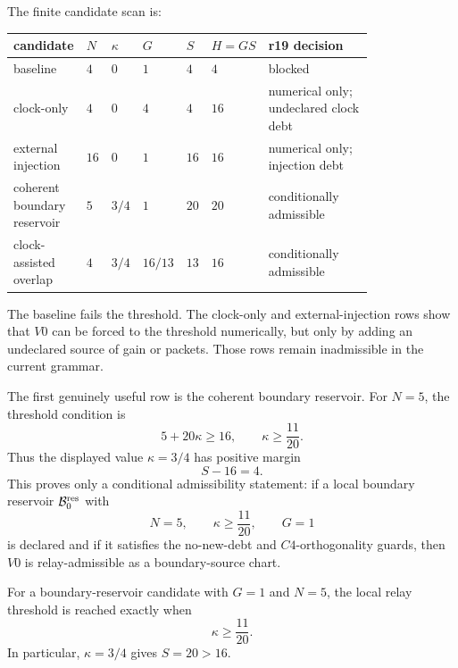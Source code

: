 The finite candidate scan is:
\begin{center}
\begin{tabular}{@{}>{\raggedright\arraybackslash}p{0.19\linewidth}>{\raggedright\arraybackslash}p{0.04\linewidth}>{\raggedright\arraybackslash}p{0.065\linewidth}>{\raggedright\arraybackslash}p{0.075\linewidth}>{\raggedright\arraybackslash}p{0.04\linewidth}>{\raggedright\arraybackslash}p{0.09\linewidth}>{\raggedright\arraybackslash}p{0.3\linewidth}@{}}
candidate & \(N\) & \(\kappa\) & \(G\) & \(S\) & \(H=GS\) & r19 decision\\
\hline
baseline & \(4\) & \(0\) & \(1\) & \(4\) & \(4\) & blocked\\
clock-only & \(4\) & \(0\) & \(4\) & \(4\) & \(16\) & numerical only; undeclared clock debt\\
external injection & \(16\) & \(0\) & \(1\) & \(16\) & \(16\) & numerical only; injection debt\\
coherent boundary reservoir & \(5\) & \(3/4\) & \(1\) & \(20\) & \(20\) & conditionally admissible\\
clock-assisted overlap & \(4\) & \(3/4\) & \(16/13\) & \(13\) & \(16\) & conditionally admissible\\
\end{tabular}
\end{center}
The baseline fails the threshold.  The clock-only and external-injection rows
show that \(V0\) can be forced to the threshold numerically, but only by adding
an undeclared source of gain or packets.  Those rows remain inadmissible in the
current grammar.

The first genuinely useful row is the coherent boundary reservoir.  For
\(N=5\), the threshold condition is
\[
5+20\kappa\ge 16,
\qquad
\kappa\ge\frac{11}{20}.
\]
Thus the displayed value \(\kappa=3/4\) has positive margin
\[
S-16=4.
\]
This proves only a conditional admissibility statement: if a local boundary
reservoir \(\mathcal B_0^{\rm res}\) with
\[
N=5,
\qquad
\kappa\ge\frac{11}{20},
\qquad
G=1
\]
is declared and if it satisfies the no-new-debt and \(C4\)-orthogonality guards,
then \(V0\) is relay-admissible as a boundary-source chart.

\begin{lemma}
\label{lem:v470-r19-minimal-coherent-reservoir-threshold}
For a boundary-reservoir candidate with \(G=1\) and \(N=5\), the local relay
threshold is reached exactly when
\[
\kappa\ge\frac{11}{20}.
\]
In particular, \(\kappa=3/4\) gives \(S=20>16\).
\end{lemma}

